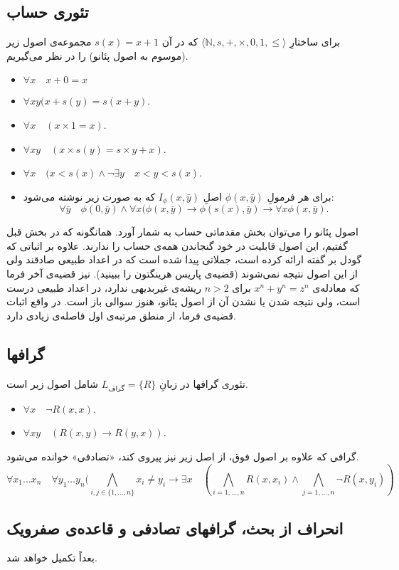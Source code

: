 \documentclass[12pt,a4paper]{article}
\theoremstyle{colorhead}
\begin{document}
\subsection{تئوری حساب}
برای ساختارِ
$\langle \mathbb{N},s,+,\times,0,1,\leq\rangle$
که در آن
$s(x)=x+1$
مجموعه‌ی اصول زیر (موسوم به اصول پئانو) را در نظر می‌گیریم.
\begin{itemize}
\item 
$\forall x\quad x+0=x$
\item 
$\forall xy (x+s(y)=s(x+y)$.
\item 
$\forall x \quad (x\times 1=x)$.
\item 
$\forall xy \quad (x\times s(y)=s\times y+x)$.
\item 
$\forall x \quad (x<s(x) \wedge \neg \exists y \quad x<y<s(x)$.
\item 
برای هر فرمولِ
$\phi(x,\bar{y})$
اصلِ
$I_\phi(x,\bar{y})$
که به صورت زیر نوشته می‌شود:
\[
\forall \bar{y}\quad \phi(0,\bar{y})\wedge \forall x (\phi(x,\bar{y})\to \phi(s(x),\bar{y})\to \forall x\phi(x,\bar{y}).
\]
\end{itemize}
اصول پئانو را می‌توان بخش مقدماتی حساب به شمار آورد. همانگونه که در بخش قبل گفتیم، این اصول قابلیت در خود گنجاندن همه‌ی حساب را ندارند. علاوه بر
اثباتی که گودل بر گفته ارائه کرده است، جملاتی پیدا شده است که در
اعداد طبیعی صادقند ولی از این اصول نتیجه نمی‌شوند (قضیه‌ی پاریس هرینگتون را ببینید). نیز قضیه‌ی آخر فرما که  معادله‌ی
$x^n+y^n=z^n$
برای
$n>2$
ریشه‌‌ی غیربدیهی ندارد، در اعداد طبیعی درست است، ولی نتیجه شدن یا نشدن آن از اصول پئانو، هنوز سوالی باز است. 
در واقع اثبات قضیه‌ی فرما، از منطق مرتبه‌ی اول فاصله‌ی زیادی دارد.
\subsection{گرافها}
تئوری گرافها در 
زبانِ 
$L_{\text{گراف}}=\{R\}$
شامل اصول زیر است.
\begin{itemize}
\item 
$\forall x\quad \neg R(x,x)$.
\item 
$\forall xy\quad (R(x,y)\to R(y,x))$.
\end{itemize}
گرافی که علاوه بر اصول فوق، از اصل زیر نیز پیروی کند، «تصادفی» خوانده می‌شود. 
\[
\forall x_1\ldots x_n\quad \forall y_1\ldots y_n 
(\bigwedge_{i,j\in \{1,\ldots,n\}} x_i\not=y_i\to \exists x \quad (\bigwedge_{i=1,\ldots,n} R(x,x_i)\wedge \bigwedge_{j=1,\ldots,n} \neg R(x,y_i))\]
\subsection{انحراف از بحث، گرافهای تصادفی و قاعده‌ی صفرویک}
بعداً تکمیل خواهد شد.
\end{document}
